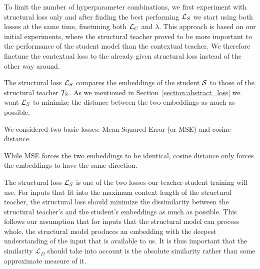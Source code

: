 %

To limit the number of hyperparameter combinations, we first experiment with
structural loss only and after finding the best performing $\mathcal{L}_S$ we start
using both losses at the same time, finetuning both $\mathcal{L}_C$ and $\lambda$.
This approach is based on our initial experiments, where the structural teacher
proved to be more important to the performance of the student model than the
contextual teacher. We therefore finetune the contextual loss to the already
given structural loss instead of the other way around.


The structural loss $\mathcal{L}_S$ compares the embeddings of the student $\mathcal{S}$
to those of the structural teacher $\mathcal{T}_S$. As we mentioned in
Section~\ref{section:abstract_loss} we want $\mathcal{L}_S$ to minimize the distance
between the two embeddings as much as possible.

We considered two basic losses: Mean Squared Error (or MSE) and cosine
distance.


While MSE forces the two
embeddings to be identical, cosine distance only forces the embeddings to have
the same direction.

The structural loss $\mathcal{L}_S$ is one of the two losses our teacher-student
training will use. For inputs that fit into the maximum context length of the
structural teacher, the structural loss should minimize the dissimilarity
between the structural teacher's and the student's embeddings as much as
possible. This follows our assumption that for inputs that the structural model
can process whole, the structural model produces an embedding with the deepest
understanding of the input that is available to us. It is thus important that
the similarity $\mathcal{L}_D$ should take into account is the absolute
similarity rather than some approximate measure of it.

